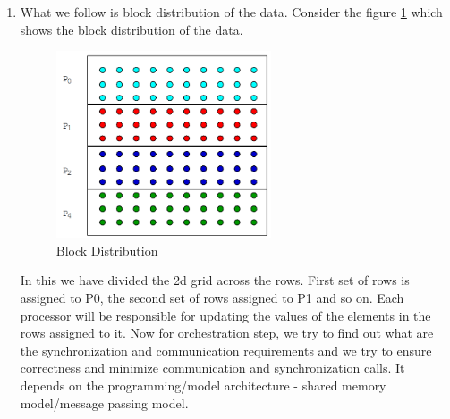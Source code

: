 \documentclass[12pt]{article}
\begin{document}
\begin{enumerate}
\item What we follow is block distribution of the data. Consider the figure \ref{fig:block} which shows the block distribution of the data.
\begin{figure}[H]
    \centering
    \includegraphics[width=0.6\textwidth]{images/block.png}
    \caption{Block Distribution}
    \label{fig:block}
\end{figure}
In this we have divided the 2d grid across the rows. First set of rows is assigned to P0, the second set of rows assigned to P1 and so on. Each processor will be responsible 
for updating the values of the elements in the rows assigned to it. Now for orchestration step, we try to find out what are the synchronization and communication requirements and we try to ensure correctness and minimize communication and synchronization calls.
It depends on the programming/model architecture - shared memory model/message passing model. 
\end{enumerate}
\end{document}
